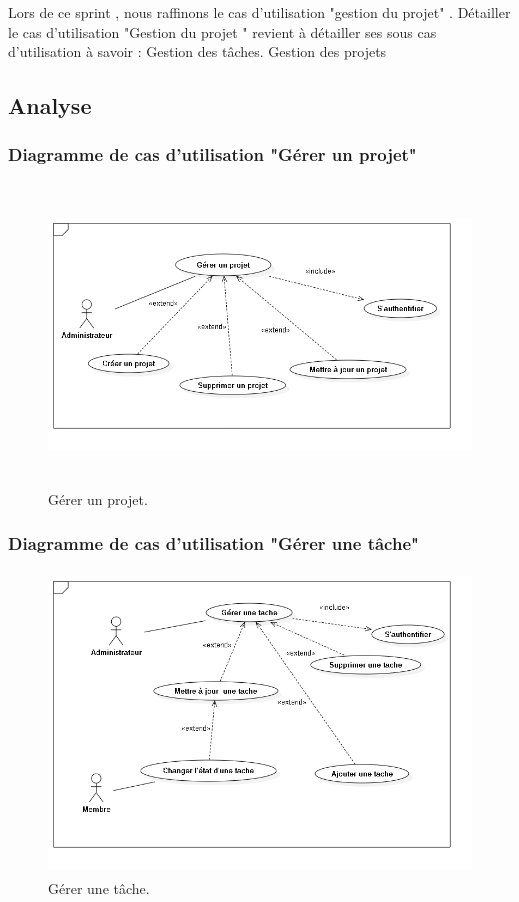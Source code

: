 Lors de ce sprint , nous  raffinons le cas d’utilisation "gestion du projet" .
D\'{e}tailler le cas d'utilisation "Gestion du projet " revient \`{a} d\'{e}tailler
ses sous cas d'utilisation \`{a} savoir : \newline
\textbullet{} Gestion des t\^{a}ches. \newline
\textbullet{} Gestion des projets \newline
\subsection{Analyse}

\subsubsection{ Diagramme de cas d'utilisation "G\'{e}rer un projet"}

\begin{figure}[H]
\center
\includegraphics[width=13cm,height=8cm]{./figures/ucP.png}
\caption{G\'{e}rer un projet.}

\end{figure}

\subsubsection{ Diagramme de cas d'utilisation "G\'{e}rer une t\^{a}che"}
\begin{figure}[H]
\center
\includegraphics[width=13cm,height=8cm]{./figures/ucT.png}
\caption{G\'{e}rer une t\^{a}che.}

\end{figure}



